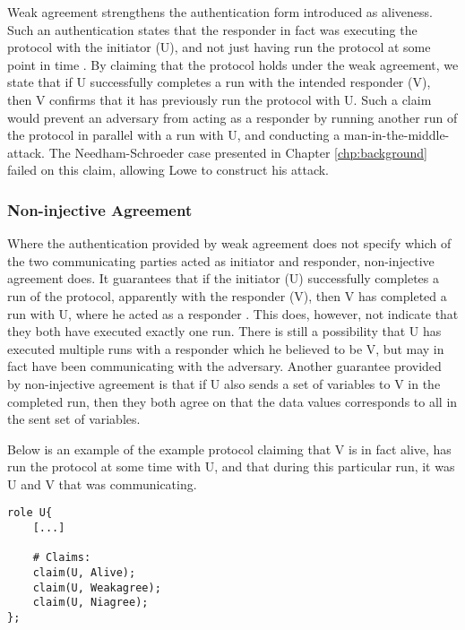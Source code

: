 Weak agreement strengthens the authentication form introduced as aliveness. Such an authentication states that the responder in fact was executing the protocol with the initiator (U), and not just having run the protocol at some point in time \cite{lowe1997hierarchy}. By claiming that the protocol holds under the weak agreement, we state that if U successfully completes a run with the intended responder (V), then V confirms that it has previously run the protocol with U. Such a claim would prevent an adversary from acting as a responder by running another run of the protocol in parallel with a run with U, and conducting a man-in-the-middle-attack. The Needham-Schroeder case presented in Chapter \ref{chp:background} failed on this claim, allowing Lowe to construct his attack. 


\subsubsection{Non-injective Agreement}

Where the authentication provided by weak agreement does not specify which of the two communicating parties acted as initiator and responder, non-injective agreement does. It guarantees that if the initiator (U) successfully completes a run of the protocol, apparently with the responder (V), then V has completed a run with U, where he acted as a responder \cite{lowe1997hierarchy}. This does, however, not indicate that they both have executed exactly one run. There is still a possibility that U has executed multiple runs with a responder which he believed to be V, but may in fact have been communicating with the adversary. Another guarantee provided by non-injective agreement is that if U also sends a set of variables to V in the completed run, then they both agree on that the data values corresponds to all in the sent set of variables.


Below is an example of the example protocol claiming that V is in fact alive, has run the protocol at some time with U, and that during this particular run, it was U and V that was communicating.\newline

\begin{lstlisting}
role U{
	[...]
	
	# Claims:
	claim(U, Alive);
	claim(U, Weakagree);
	claim(U, Niagree);
};
\end{lstlisting} 





